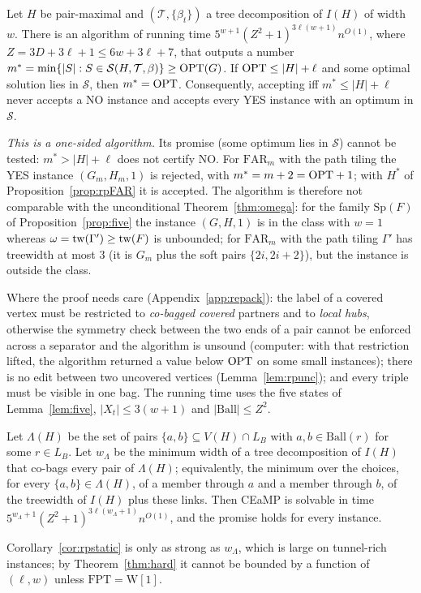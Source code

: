 \begin{theorem}\label{thm:rpPL}
Let $H$ be pair-maximal and $(\mathcal T,\{\beta_t\})$ a tree decomposition of $I(H)$ of width $w$. There is an algorithm of running time $5^{w+1}(Z^2+1)^{3\ell(w+1)}n^{O(1)}$, where $Z=3D+3\ell+1\le6w+3\ell+7$, that outputs a number $m^*=\min\{|S|:S\in\mathcal S(H,\mathcal T,\beta)\}\ge\mathrm{OPT}(G)$. If $\mathrm{OPT}\le|H|+\ell$ and some optimal solution lies in $\mathcal S$, then $m^*=\mathrm{OPT}$. Consequently, accepting iff $m^*\le|H|+\ell$ never accepts a NO instance and accepts every YES instance with an optimum in $\mathcal S$.
\end{theorem}
\emph{This is a one-sided algorithm.} Its promise (some optimum lies in $\mathcal S$) cannot be tested: $m^*>|H|+\ell$ does not certify NO. For $\mathrm{FAR}_m$ with the path tiling the YES instance $(G_m,H_m,1)$ is rejected, with $m^*=m+2=\mathrm{OPT}+1$; with $H^*$ of Proposition~\ref{prop:rpFAR} it is accepted. The algorithm is therefore not comparable with the unconditional Theorem~\ref{thm:omega}: for the family $\mathrm{Sp}(F)$ of Proposition~\ref{prop:five} the instance $(G,H,1)$ is in the class with $w=1$ whereas $\omega=\mathrm{tw}(\Gamma')\ge\mathrm{tw}(F)$ is unbounded; for $\mathrm{FAR}_m$ with the path tiling $\Gamma'$ has treewidth at most $3$ (it is $G_m$ plus the soft pairs $\{2i,2i+2\}$), but the instance is outside the class.

Where the proof needs care (Appendix~\ref{app:repack}): the label of a covered vertex must be restricted to \emph{co-bagged covered} partners and to \emph{local hubs}, otherwise the symmetry check between the two ends of a pair cannot be enforced across a separator and the algorithm is unsound (computer: with that restriction lifted, the algorithm returned a value below $\mathrm{OPT}$ on some small instances); there is no edit between two uncovered vertices (Lemma~\ref{lem:rpunc}); and every triple must be visible in one bag. The running time uses the five states of Lemma~\ref{lem:five}, $|X_t|\le3(w+1)$ and $|\mathrm{Ball}|\le Z^2$.

\begin{corollary}\label{cor:rpstatic}
Let $\Lambda(H)$ be the set of pairs $\{a,b\}\subseteq V(H)\cap L_B$ with $a,b\in\mathrm{Ball}(r)$ for some $r\in L_B$. Let $w_\Lambda$ be the minimum width of a tree decomposition of $I(H)$ that co-bags every pair of $\Lambda(H)$; equivalently, the minimum over the choices, for every $\{a,b\}\in\Lambda(H)$, of a member through $a$ and a member through $b$, of the treewidth of $I(H)$ plus these links. Then CEaMP is solvable in time $5^{w_\Lambda+1}(Z^2+1)^{3\ell(w_\Lambda+1)}n^{O(1)}$, and the promise holds for every instance.
\end{corollary}
Corollary~\ref{cor:rpstatic} is only as strong as $w_\Lambda$, which is large on tunnel-rich instances; by Theorem~\ref{thm:hard} it cannot be bounded by a function of $(\ell,w)$ unless $\mathrm{FPT}=\mathrm{W[1]}$.

